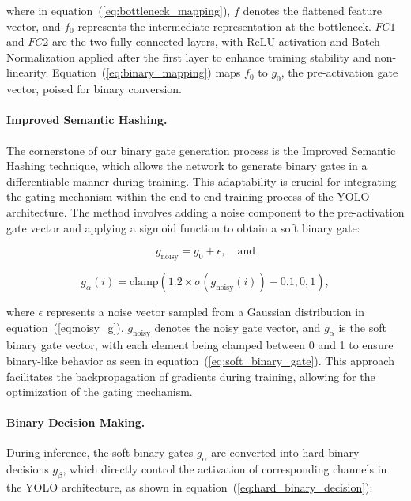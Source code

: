 \noindent{}where in equation~(\ref{eq:bottleneck_mapping}), \(f\) denotes the flattened feature vector, and \(f_0\) represents the intermediate representation at the bottleneck. \(FC1\) and \(FC2\) are the two fully connected layers, with ReLU activation and Batch Normalization applied after the first layer to enhance training stability and non-linearity. Equation~(\ref{eq:binary_mapping}) maps \(f_0\) to \(g_0\), the pre-activation gate vector, poised for binary conversion.

\paragraph{Improved Semantic Hashing.} The cornerstone of our binary gate generation process is the Improved Semantic Hashing technique, which allows the network to generate binary gates in a differentiable manner during training. This adaptability is crucial for integrating the gating mechanism within the end-to-end training process of the YOLO architecture. The method involves adding a noise component to the pre-activation gate vector and applying a sigmoid function to obtain a soft binary gate:

\begin{equation}
g_{\text{noisy}} = g_0 + \epsilon, \quad \text{and}
\label{eq:noisy_g}
\end{equation}

\begin{equation}
g_{\alpha}(i) = \text{clamp}(1.2 \times \sigma(g_{\text{noisy}}(i)) - 0.1, 0, 1),
\label{eq:soft_binary_gate}
\end{equation}

\noindent{}where \(\epsilon\) represents a noise vector sampled from a Gaussian distribution in equation~(\ref{eq:noisy_g}). \(g_{\text{noisy}}\) denotes the noisy gate vector, and \(g_{\alpha}\) is the soft binary gate vector, with each element being clamped between 0 and 1 to ensure binary-like behavior as seen in equation~(\ref{eq:soft_binary_gate}). This approach facilitates the backpropagation of gradients during training, allowing for the optimization of the gating mechanism.

\paragraph{Binary Decision Making.} During inference, the soft binary gates \(g_{\alpha}\) are converted into hard binary decisions \(g_{\beta}\), which directly control the activation of corresponding channels in the YOLO architecture, as shown in equation~(\ref{eq:hard_binary_decision}):

